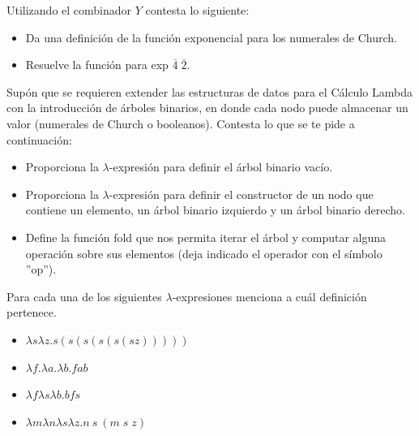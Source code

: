                 \begin{exercise}
                    Utilizando el combinador $Y$ contesta lo siguiente: 
                    \begin{itemize}
                    	\item Da una definición de la función exponencial para los numerales de Church.
                    	\item Resuelve la función para \textsf{exp} $\overline{4} \; \overline{2}$.
		    \end{itemize}
                \end{exercise}


		\begin{exercise}
			Supón que se requieren extender las estructuras de datos para el Cálculo Lambda con la introducción de árboles binarios, en donde cada nodo puede almacenar un valor (numerales de Church o booleanos). Contesta lo que se te pide a continuación:\\
			\begin{itemize}
				\item Proporciona la $\lambda$-expresión para definir el árbol binario vacío.
				\item Proporciona la $\lambda$-expresión para definir el constructor de un nodo que contiene un elemento, un árbol binario izquierdo y un árbol binario derecho.
				\item Define la función \textsf{fold} que nos permita iterar el árbol y computar alguna operación sobre sus elementos (deja indicado el operador con el símbolo ''op'').
			\end{itemize}
		\end{exercise}



		\begin{exercise}
			Para cada una de los siguientes $\lambda$-expresiones menciona a cuál definición pertenece.
			\begin{itemize}
				\item $\lambda s\lambda z.s(s(s(s(s(sz)))))$
				\item $\lambda f.\lambda a.\lambda b.fab $
				\item $\lambda f\lambda s\lambda b. bfs$
				\item $\lambda m\lambda n\lambda s\lambda z.n\ s\  (m \; s \; z)$
			\end{itemize}
		\end{exercise}

                    
            